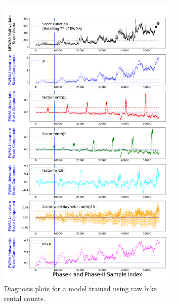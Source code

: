 \documentclass[twoside,11pt]{article}
\begin{document}
\begin{figure}[!htbp]
\centering
    \begin{subfigure}[t]{0.49\linewidth}
     \centering
         \includegraphics[width=1.0\textwidth, trim=.0in .0in .0in 1.2in, clip]{../figures/v14/bike_sharing/reg_lin_cat_syr_10_tr_3/neg_single_bike_fisher_mlines_with_regu_1e-08_0_0001_0_01_99_99.png}
     \captionsetup{width=.95\linewidth}
     \caption{Diagnosis plots for a model trained using raw bike rental counts.}
     \label{fig:bs_raw_cnt}
\end{subfigure}
\begin{subfigure}[t]{0.49\linewidth}
     \centering

\end{subfigure}
\end{figure}
\end{document}
